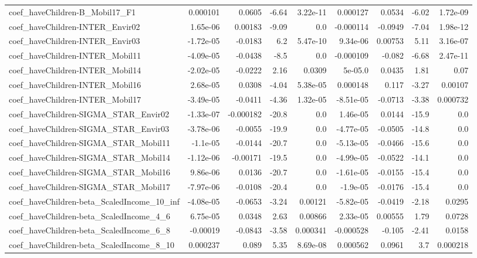 \begin{tabular}{lrrrrrrrr}
coef_haveChildren-B_Mobil17_F1 & 0.000101 & 0.0605 & -6.64 & 3.22e-11 & 0.000127 & 0.0534 & -6.02 & 1.72e-09 \\
coef_haveChildren-INTER_Envir02 & 1.65e-06 & 0.00183 & -9.09 & 0.0 & -0.000114 & -0.0949 & -7.04 & 1.98e-12 \\
coef_haveChildren-INTER_Envir03 & -1.72e-05 & -0.0183 & 6.2 & 5.47e-10 & 9.34e-06 & 0.00753 & 5.11 & 3.16e-07 \\
coef_haveChildren-INTER_Mobil11 & -4.09e-05 & -0.0438 & -8.5 & 0.0 & -0.000109 & -0.082 & -6.68 & 2.47e-11 \\
coef_haveChildren-INTER_Mobil14 & -2.02e-05 & -0.0222 & 2.16 & 0.0309 & 5e-05.0 & 0.0435 & 1.81 & 0.07 \\
coef_haveChildren-INTER_Mobil16 & 2.68e-05 & 0.0308 & -4.04 & 5.38e-05 & 0.000148 & 0.117 & -3.27 & 0.00107 \\
coef_haveChildren-INTER_Mobil17 & -3.49e-05 & -0.0411 & -4.36 & 1.32e-05 & -8.51e-05 & -0.0713 & -3.38 & 0.000732 \\
coef_haveChildren-SIGMA_STAR_Envir02 & -1.33e-07 & -0.000182 & -20.8 & 0.0 & 1.46e-05 & 0.0144 & -15.9 & 0.0 \\
coef_haveChildren-SIGMA_STAR_Envir03 & -3.78e-06 & -0.0055 & -19.9 & 0.0 & -4.77e-05 & -0.0505 & -14.8 & 0.0 \\
coef_haveChildren-SIGMA_STAR_Mobil11 & -1.1e-05 & -0.0144 & -20.7 & 0.0 & -5.13e-05 & -0.0466 & -15.6 & 0.0 \\
coef_haveChildren-SIGMA_STAR_Mobil14 & -1.12e-06 & -0.00171 & -19.5 & 0.0 & -4.99e-05 & -0.0522 & -14.1 & 0.0 \\
coef_haveChildren-SIGMA_STAR_Mobil16 & 9.86e-06 & 0.0136 & -20.7 & 0.0 & -1.61e-05 & -0.0155 & -15.4 & 0.0 \\
coef_haveChildren-SIGMA_STAR_Mobil17 & -7.97e-06 & -0.0108 & -20.4 & 0.0 & -1.9e-05 & -0.0176 & -15.4 & 0.0 \\
coef_haveChildren-beta_ScaledIncome_10_inf & -4.08e-05 & -0.0653 & -3.24 & 0.00121 & -5.82e-05 & -0.0419 & -2.18 & 0.0295 \\
coef_haveChildren-beta_ScaledIncome_4_6 & 6.75e-05 & 0.0348 & 2.63 & 0.00866 & 2.33e-05 & 0.00555 & 1.79 & 0.0728 \\
coef_haveChildren-beta_ScaledIncome_6_8 & -0.00019 & -0.0843 & -3.58 & 0.000341 & -0.000528 & -0.105 & -2.41 & 0.0158 \\
coef_haveChildren-beta_ScaledIncome_8_10 & 0.000237 & 0.089 & 5.35 & 8.69e-08 & 0.000562 & 0.0961 & 3.7 & 0.000218 \\

\end{tabular}
